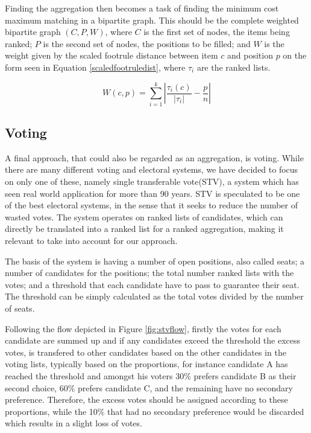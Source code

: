 Finding the aggregation then becomes a task of finding the minimum cost maximum matching in a bipartite graph. This should be the complete weighted bipartite graph $(C, P, W)$, where $C$ is the first set of nodes, the items being ranked; $P$ is the second set of nodes, the positions to be filled; and $W$ is the weight given by the scaled footrule distance between item $c$ and position $p$ on the form seen in Equation \ref{scaledfootruledist}, where $\tau_{i}$ are the ranked lists.

\begin{equation} \label{scaledfootruledist}
	W(c,p) = \sum_{i=1}^{k} \left | \frac{\tau_{i}(c)}{\left |\tau_{i}  \right |} - \frac{p}{n} \right |
\end{equation}

\subsection{Voting} \label{sec:stv}
A final approach, that could also be regarded as an aggregation, is voting. While there are many different voting and electoral systems, we have decided to focus on only one of these, namely single transferable vote(STV), a system which has seen real world application for more than 90 years\cite{stvireland}.
STV is speculated to be one of the best electoral systems, in the sense that it seeks to reduce the number of wasted votes. The system operates on ranked lists of candidates, which can directly be translated into a ranked list for a ranked aggregation, making it relevant to take into account for our approach.

The basis of the system is having a number of open positions, also called seats; a number of candidates for the positions; the total number ranked lists with the votes; and a threshold that each candidate have to pass to guarantee their seat. The threshold can be simply calculated as the total votes divided by the number of seats\cite{stv}.

Following the flow depicted in Figure \ref{fig:stvflow}, firstly the votes for each candidate are summed up and if any candidates exceed the threshold the excess votes, is transfered to other candidates based on the other candidates in the voting lists, typically based on the proportions, for instance candidate A has reached the threshold and amongst his voters 30\% prefers candidate B as their second choice, 60\% prefers candidate C, and the remaining have no secondary preference. Therefore, the excess votes should be assigned according to these proportions, while the 10\% that had no secondary preference would be discarded which results in a slight loss of votes.

